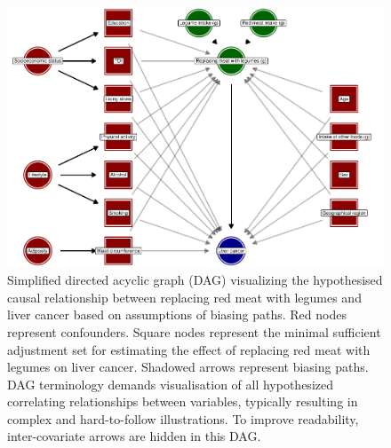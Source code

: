 \documentclass[
]{article}
\begin{document}
\begin{figure}[t]

{\centering \includegraphics[width=1\linewidth,]{report_files/figure-latex/fig2-1} 

}

\caption{Simplified directed acyclic graph (DAG) visualizing the hypothesised causal relationship between replacing red meat with legumes and liver cancer based on assumptions of biasing paths. Red nodes represent confounders. Square nodes represent the minimal sufficient adjustment set for estimating the effect of replacing red meat with legumes on liver cancer. Shadowed arrows represent biasing paths. DAG terminology demands visualisation of all hypothesized correlating relationships between variables, typically resulting in complex and hard-to-follow illustrations. To improve readability, inter-covariate arrows are hidden in this DAG.}\label{fig:fig2}
\end{figure}

\twocolumn

\printbibliography
\end{document}
